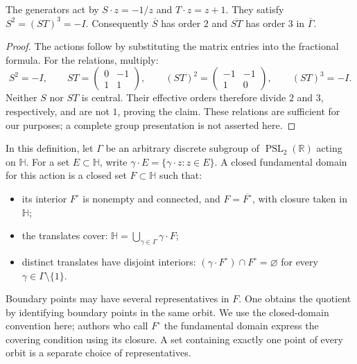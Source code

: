 \begin{proposition}\label{modular.generator-relations}
The generators act by $S\cdot z=-1/z$ and $T\cdot z=z+1$. They satisfy $S^2=(ST)^3=-I$. Consequently $\overline S$ has order $2$ and $\overline{ST}$ has order $3$ in $\overline\Gamma$.
\end{proposition}

\begin{proof}
The actions follow by substituting the matrix entries into the fractional formula. For the relations, multiply:
\[
 S^2=-I,\qquad
 ST=\begin{pmatrix}0&-1\\1&1\end{pmatrix},\qquad
 (ST)^2=\begin{pmatrix}-1&-1\\1&0\end{pmatrix},\qquad
 (ST)^3=-I.
\]
Neither $S$ nor $ST$ is central. Their effective orders therefore divide $2$ and $3$, respectively, and are not $1$, proving the claim. These relations are sufficient for our purposes; a complete group presentation is not asserted here.
\end{proof}

\begin{definition}\label{modular.fundamental-domain-definition}
In this definition, let $\Gamma$ be an arbitrary discrete subgroup of $\operatorname{PSL}_2(\mathbb R)$ acting on $\mathbb H$. For a set $E\subset\mathbb H$, write $\gamma\cdot E=\{\gamma\cdot z:z\in E\}$. A closed fundamental domain for this action is a closed set $F\subset\mathbb H$ such that:
\begin{itemize}
\item its interior $F^\circ$ is nonempty and connected, and $F=\overline{F^\circ}$, with closure taken in $\mathbb H$;
\item the translates cover: $\mathbb H=\bigcup_{\gamma\in\Gamma}\gamma\cdot F$;
\item distinct translates have disjoint interiors: $(\gamma\cdot F^\circ)\cap F^\circ=\varnothing$ for every $\gamma\in\Gamma\setminus\{1\}$.
\end{itemize}
Boundary points may have several representatives in $F$. One obtains the quotient by identifying boundary points in the same orbit. We use the closed-domain convention here; authors who call $F^\circ$ the fundamental domain express the covering condition using its closure. A set containing exactly one point of every orbit is a separate choice of representatives.
\end{definition}

